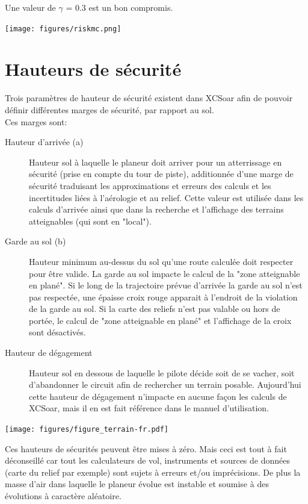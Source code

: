 Une valeur de  $\gamma$  = 0.3 est un bon compromis.

\begin{center}
\texttt{[image: figures/riskmc.png]}
\end{center}

\section{Hauteurs de sécurité}\label{sec:safety-heights}
Trois paramètres de hauteur de sécurité existent dans XCSoar afin de pouvoir définir différentes marges de sécurité, par rapport au sol.
\\
Ces marges sont:
\begin{description}
\item[Hauteur d'arrivée (a)]  Hauteur sol à laquelle le planeur doit arriver pour un atterrissage en sécurité (prise en compte du tour de piste), additionnée d'une marge de sécurité traduisant les  approximations et erreurs des calculs et les incertitudes liées à l'aérologie et au relief. Cette valeur est utilisée dans les calculs d'arrivée ainsi que dans la recherche et l'affichage des terrains atteignables (qui sont en "local").
\item[Garde au sol (b)] Hauteur minimum au-dessus du sol qu'une route calculée doit respecter pour être valide. La garde au sol impacte le calcul de la "zone atteignable en plané". Si le long de la trajectoire prévue d'arrivée la garde au sol n'est pas respectée, une épaisse croix rouge apparait à l'endroit de la violation de la garde au sol. Si la carte des reliefs n'est pas valable ou hors de portée, le calcul de "zone atteignable en plané" et l'affichage de la croix sont désactivés. 
\item[Hauteur de dégagement]  Hauteur sol en dessous de laquelle le pilote décide soit de se vacher, soit d'abandonner le circuit afin de rechercher un terrain posable. Aujourd'hui cette hauteur de dégagement n'impacte en aucune façon les calculs de XCSoar, mais il en est fait référence dans le manuel d'utilisation.
\end{description}

\begin{center}
\texttt{[image: figures/figure\_terrain-fr.pdf]}
\end{center}

\warning
Ces hauteurs de sécurités peuvent être mises à zéro. Mais ceci est tout à fait déconseillé car tout les calculateurs de vol, instruments et sources de données (carte du relief par exemple) sont sujets à erreurs et/ou imprécisions. De plus la masse d'air dans laquelle le planeur évolue est instable et soumise à des évolutions à caractère aléatoire.

